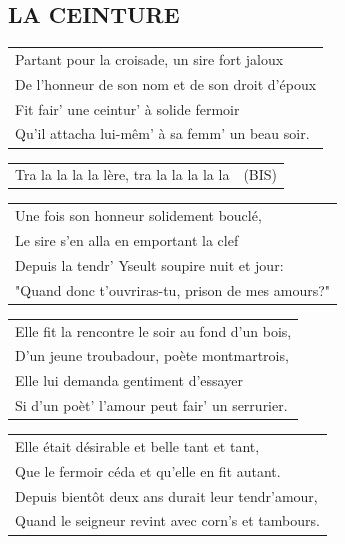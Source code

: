 \documentclass[a4paper, 14pt]{extarticle}
\begin{document}
\subsection*{LA CEINTURE}
\begin{flushleft}
\begin{tabularx}{0.8\textwidth} {
    >{\raggedright\arraybackslash}X}
Partant pour la croisade, un sire fort jaloux\\
De l’honneur de son nom et de son droit d’époux\\
Fit fair’ une ceintur’ à solide fermoir\\
Qu’il attacha lui-mêm’ à sa femm’ un beau soir.\\
\end{tabularx}
\end{flushleft}
\begin{flushleft}
\begin{tabularx}{0.8\textwidth} {
    >{\raggedright\arraybackslash}X c}
Tra la la la la lère, tra la la la la la & (BIS) \\
\end{tabularx}
\end{flushleft}
\begin{flushleft}
\begin{tabularx}{0.8\textwidth} {
    >{\raggedright\arraybackslash}X}
Une fois son honneur solidement bouclé,\\
Le sire s’en alla en emportant la clef\\
Depuis la tendr’ Yseult soupire nuit et jour:\\
"Quand donc t’ouvriras-tu, prison de mes amours?"\\
\end{tabularx}
\end{flushleft}
\begin{flushleft}
\begin{tabularx}{0.8\textwidth} {
    >{\raggedright\arraybackslash}X}
Elle fit la rencontre le soir au fond d’un bois,\\
D’un jeune troubadour, poète montmartrois,\\
Elle lui demanda gentiment d’essayer\\
Si d’un poèt’ l’amour peut fair’ un serrurier.\\
\end{tabularx}
\end{flushleft}
\begin{flushleft}
\begin{tabularx}{0.8\textwidth} {
    >{\raggedright\arraybackslash}X}
Elle était désirable et belle tant et tant,\\
Que le fermoir céda et qu’elle en fit autant.\\
Depuis bientôt deux ans durait leur tendr’amour,\\
Quand le seigneur revint avec corn’s et tambours.\\
\end{tabularx}
\end{flushleft}
\end{document}
